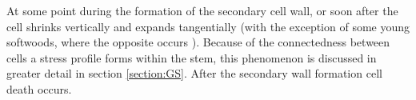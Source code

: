 At some point during the formation of the secondary cell wall, or soon after the
cell shrinks vertically and expands tangentially \citep{Boyd_1972} (with the exception of
some young softwoods, where the opposite occurs \citep{jacobs1945l}). Because of the connectedness
between cells a stress profile forms within the stem, this phenomenon is discussed
in greater detail in section \ref{section:GS}. After the secondary wall formation cell death
occurs.